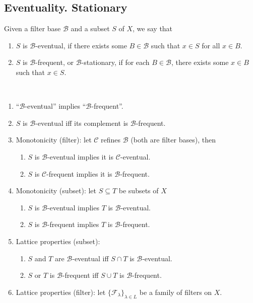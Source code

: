 \documentclass{treatise}
\begin{document}
\subsection{Eventuality. Stationary}
Given a filter base $\mathcal{B}$ and a subset $S$ of $X$, we say that
\begin{enumerate}
    \item $S$ is $\mathcal{B}$-eventual, if there exists some $B \in \mathcal{B}$ such that $x \in S$ for all $x \in B$.
    \item $S$ is $\mathcal{B}$-frequent, or $\mathcal{B}$-stationary, if for each $B \in \mathcal{B}$, there exists some $x \in B$ such that $x \in S$. 
\end{enumerate}
\begin{lemma} \label{event-freq-equiv} \ 
\begin{enumerate}
    \item ``$\mathcal{B}$-eventual'' implies ``$\mathcal{B}$-frequent''.
    \item $S$ is $\mathcal{B}$-eventual iff its complement is $\mathcal{B}$-frequent.
    \item Monotonicity (filter): let $\mathcal{C}$ refines $\mathcal{B}$ (both are filter bases), then
    \begin{enumerate}
        \item $S$ is $\mathcal{B}$-eventual implies it is $\mathcal{C}$-eventual.
        \item $S$ is $\mathcal{C}$-frequent implies it is $\mathcal{B}$-frequent.
    \end{enumerate}
    \item Monotonicity (subset): let $S \subseteq T$  be subsets of $X$
    \begin{enumerate}
        \item $S$ is $\mathcal{B}$-eventual implies $T$ is $\mathcal{B}$-eventual.
        \item $S$ is $\mathcal{B}$-frequent implies $T$ is $\mathcal{B}$-frequent.
    \end{enumerate}
    \item Lattice properties (subset):
    \begin{enumerate}
        \item $S$ and $T$ are $\mathcal{B}$-eventual iff $S \cap T$ is $\mathcal{B}$-eventual.
        \item $S$ or $T$ is $\mathcal{B}$-frequent iff $S \cup T$ is $\mathcal{B}$-frequent.
    \end{enumerate}
    \item Lattice properties (filter): let $\{ \mathcal{F}_\lambda \}_{\lambda \in L}$ be a family of filters on $X$.

\end{enumerate}
\end{lemma}
\end{document}
